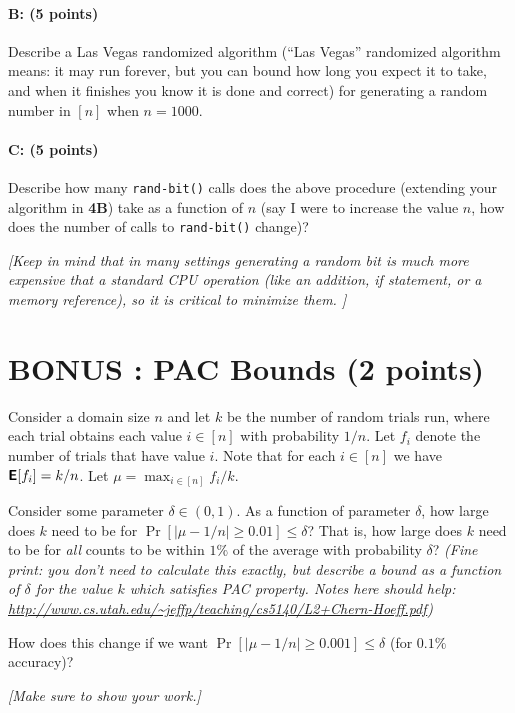 \documentclass[11pt]{article}
\begin{document}
\paragraph{B: (5 points)}
Describe a Las Vegas randomized algorithm (``Las Vegas'' randomized algorithm means: it may run forever, but you can bound how long you expect it to take, and when it finishes you know it is done and correct) for generating a random number in $[n]$ when $n=1000$.  

\paragraph{C: (5 points)}  
Describe how many \texttt{rand-bit()} calls does the above procedure (extending your algorithm in \textbf{4B}) take as a function of $n$ (say I were to increase the value $n$, how does the number of calls to \texttt{rand-bit()} change)?  

\emph{[Keep in mind that in many settings generating a random bit is much more expensive that a standard CPU operation (like an addition, if statement, or a memory reference), so it is critical to minimize them.  ]}


\vspace{-.1in}
\section{BONUS : PAC Bounds (2 points)}

Consider a domain size $n$ and let $k$ be the number of random trials run, where each trial obtains each value $i \in [n]$ with probability $1/n$.  
Let $f_i$ denote the number of trials that have value $i$.  
Note that for each $i \in [n]$ we have $\textbf{\textsf{E}}[f_i] = k/n$.  
Let $\mu = \max_{i \in [n]} f_i/k$.  

Consider some parameter $\delta \in (0,1)$.  
As a function of parameter $\delta$, how large does $k$ need to be for 
$\Pr[ |\mu - 1/n| \geq 0.01] \leq \delta$?
That is, how large does $k$ need to be for \emph{all} counts to be within $1\%$ of the average with probability $\delta$? 
\emph{(Fine print:  you don't need to calculate this exactly, but describe a bound as a function of $\delta$ for the value $k$ which satisfies PAC property.  Notes here should help: \url{http://www.cs.utah.edu/~jeffp/teaching/cs5140/L2+Chern-Hoeff.pdf})}

How does this change if we want
$\Pr[ |\mu - 1/n| \geq 0.001] \leq \delta$ (for $0.1\%$ accuracy)?

\emph{[Make sure to show your work.]}
\end{document}
